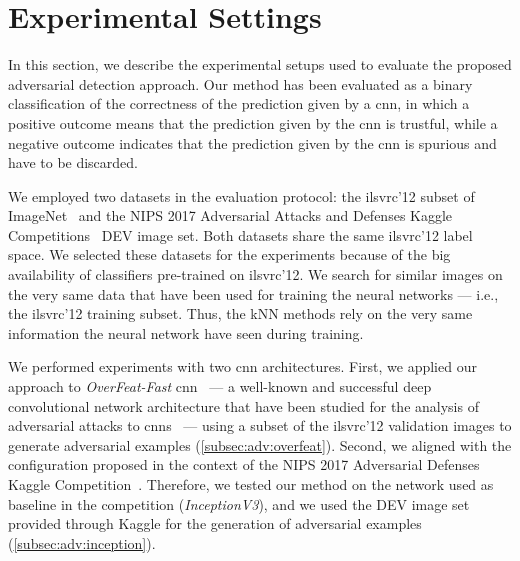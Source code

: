 
\section{Experimental Settings}
\label{sec:adv:experiments}
In this section, we describe the experimental setups used to evaluate the proposed adversarial detection approach.
Our method has been evaluated as a binary classification of the correctness of the prediction given by a \gls{cnn}, in which a positive outcome means that the prediction given by the \gls{cnn} is trustful, while a negative outcome indicates that the prediction given by the \gls{cnn} is spurious and have to be discarded.

We employed two datasets in the evaluation protocol: the \gls{ilsvrc}'12 subset of ImageNet~\cite{russakovsky2015imagenet} and the NIPS 2017 Adversarial Attacks and Defenses Kaggle Competitions~\cite{kurakin2018adversarial} DEV image set.
Both datasets share the same \gls{ilsvrc}'12 label space.
We selected these datasets for the experiments because of the big availability of classifiers pre-trained on \gls{ilsvrc}'12.
We search for similar images on the very same data that have been used for training the neural networks --- i.e., the \gls{ilsvrc}'12 training subset.
Thus, the kNN methods rely on the very same information the neural network have seen during training.

We performed experiments with two \gls{cnn} architectures.
First, we applied our approach to \emph{OverFeat-Fast} \gls{cnn}~\cite{sermanet2013overfeat} --- a well-known and successful deep convolutional network architecture that have been studied for the analysis of adversarial attacks to \glspl{cnn}~\cite{tabacof2016exploring} --- using a subset of the \gls{ilsvrc}'12 validation images to generate adversarial examples (\ref{subsec:adv:overfeat}).
Second, we aligned with the configuration proposed in the context of the NIPS 2017 Adversarial Defenses Kaggle Competition~\cite{kurakin2018adversarial}.
Therefore, we tested our method on the network used as baseline in the competition (\emph{InceptionV3}), and we used the DEV image set provided through Kaggle for the generation of adversarial examples (\ref{subsec:adv:inception}).

